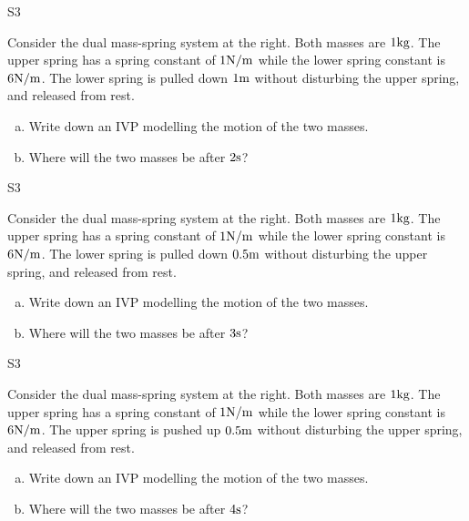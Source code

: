 \begin{problem}{S3}
\begin{minipage}[t]{0.8\linewidth}
Consider the dual mass-spring system at the right.  Both masses are \(1 {\rm kg}\).  The upper spring has a spring constant of \( 1 {\rm N/m}\) while the lower spring constant is \(6 {\rm N/m}\).  The lower spring is pulled down \(1 {\rm m}\) without disturbing the upper spring, and released from rest. 
\begin{enumerate}[(a)]
\item Write down an IVP modelling the motion of the two masses.
\item Where will the two masses be after \(2 {\rm s}\)?
\end{enumerate}
\end{minipage}
\hfill
\springdoublemassQuiz[0.7]
\hfill
\end{problem}

\begin{problem}{S3}
\begin{minipage}[t]{0.8\linewidth}
Consider the dual mass-spring system at the right.  Both masses are \(1 {\rm kg}\).  The upper spring has a spring constant of \( 1 {\rm N/m}\) while the lower spring constant is \(6 {\rm N/m}\).  The lower spring is pulled down \(0.5 {\rm m}\) without disturbing the upper spring, and released from rest. 
\begin{enumerate}[(a)]
\item Write down an IVP modelling the motion of the two masses.
\item Where will the two masses be after \(3 {\rm s}\)?
\end{enumerate}
\end{minipage}
\hfill
\springdoublemassQuiz[0.7]
\hfill
\end{problem}

\begin{problem}{S3}
\begin{minipage}[t]{0.8\linewidth}
Consider the dual mass-spring system at the right.  Both masses are \(1 {\rm kg}\).  The upper spring has a spring constant of \( 1 {\rm N/m}\) while the lower spring constant is \(6 {\rm N/m}\).  The upper spring is pushed up \(0.5 {\rm m}\) without disturbing the upper spring, and released from rest. 
\begin{enumerate}[(a)]
\item Write down an IVP modelling the motion of the two masses.
\item Where will the two masses be after \(4 {\rm s}\)?
\end{enumerate}
\end{minipage}
\hfill
\springdoublemassQuiz[0.7]
\hfill
\end{problem}

